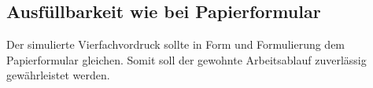 \subsection{Ausfüllbarkeit wie bei Papierformular}
Der simulierte Vierfachvordruck sollte in Form und Formulierung dem Papierformular gleichen. Somit soll der gewohnte Arbeitsablauf zuverlässig gewährleistet werden. 
